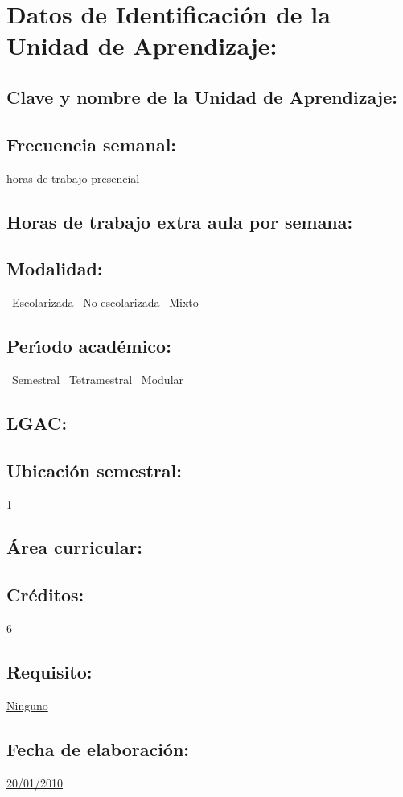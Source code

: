 \documentclass[10 pt]{article}
\begin{document}


\section{Datos de Identificaci\'{o}n de la Unidad de Aprendizaje:}
\subsection{Clave y nombre de la Unidad de Aprendizaje:} 
\subsection{Frecuencia semanal:} horas de trabajo presencial 
\subsection{Horas de trabajo extra aula por semana:} 
\subsection{Modalidad:} \yes~Escolarizada \no~No escolarizada \no~Mixto
\subsection{Per\'{\i}odo acad\'{e}mico:} \yes~Semestral
\no~Tetramestral \no~Modular
\subsection{LGAC:} \underline{\odsi}
\subsection{Ubicaci\'{o}n semestral:} \underline{1}
\subsection{\'{A}rea curricular:} \underline{\pi}
\subsection{Cr\'{e}ditos:} \underline{6}
\subsection{Requisito:} \underline{Ninguno}
\subsection{Fecha de elaboraci\'{o}n:} \underline{20/01/2010}
\end{document}
